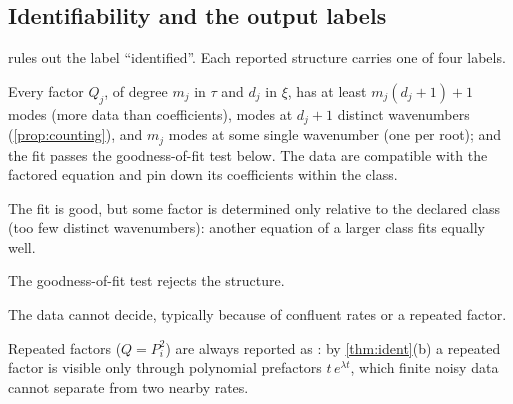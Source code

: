 \subsection{Identifiability and the output labels}\label{sec:alg-labels}
 rules out the label ``identified''. Each reported structure carries one of four labels.
\begin{description}[leftmargin=2.9cm,labelwidth=2.7cm]
  \item[\FC] Every factor $Q_j$, of degree $m_j$ in $\tau$ and $d_j$ in $\xi$, has at least $m_j(d_j+1)+1$ modes
  (more data than coefficients), modes at $d_j+1$ distinct wavenumbers (\cref{prop:counting}), and $m_j$ modes
  at some single wavenumber (one per root); and the fit passes the goodness-of-fit test below.
  The data are compatible with the factored equation and pin down its coefficients within the class.
  \item[\IDK] The fit is good, but some factor is determined only relative to the declared class (too
  few distinct wavenumbers): another equation of a larger class fits equally well.
  \item[\MIS] The goodness-of-fit test rejects the structure.
  \item[\UND] The data cannot decide, typically because of confluent rates or a repeated factor.
\end{description}
Repeated factors ($Q=P_i^2$) are always reported as \UND: by \cref{thm:ident}(b) a repeated factor is
visible only through polynomial prefactors $t\,e^{\lambda t}$, which finite noisy data cannot separate from
two nearby rates.

